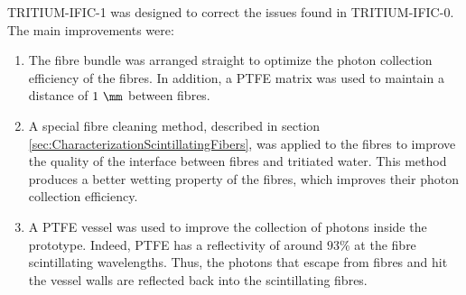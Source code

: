 TRITIUM-IFIC-1 was designed to correct the issues found in TRITIUM-IFIC-0. The main improvements were:

\begin{enumerate}

\item{} The fibre bundle was arranged straight to optimize the photon collection efficiency of the fibres. In addition, a PTFE matrix was used to maintain a distance of $1~\mm$ between fibres.

\item{} A special fibre cleaning method, described in section \ref{sec:CharacterizationScintillatingFibers}, was applied to the fibres to improve the quality of the interface between fibres and tritiated water. This method produces a better wetting property of the fibres, which improves their photon collection efficiency.

\item{} A PTFE vessel was used to improve the collection of photons inside the prototype. Indeed, PTFE has a reflectivity of around $93\%$ \cite{Reflectivity} at the fibre scintillating wavelengths. Thus, the photons that escape from fibres and hit the vessel walls are reflected back into the scintillating fibres.

\end{enumerate}

